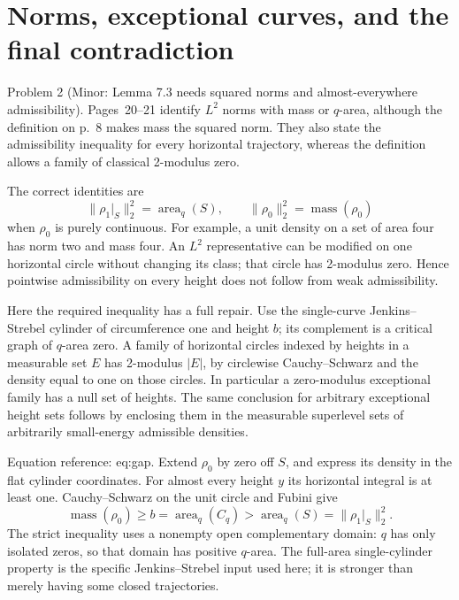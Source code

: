 \documentclass[10pt]{article}
\begin{document}
\section*{Norms, exceptional curves, and the final contradiction}
Problem 2 (Minor: Lemma 7.3 needs squared norms and almost-everywhere admissibility).  Pages 20–21 identify \(L^2\) norms with mass or \(q\)-area, although the definition on p. 8 makes mass the squared norm. They also state the admissibility inequality for every horizontal trajectory, whereas the definition allows a family of classical 2-modulus zero.\par
The correct identities are \[\|\rho_1|_S\|_2^2=\operatorname{area}_q(S),\qquad
 \|\rho_0\|_2^2=\operatorname{mass}(\rho_0)\] when \(\rho_0\) is purely continuous. For example, a unit density on a set of area four has norm two and mass four. An \(L^2\) representative can be modified on one horizontal circle without changing its class; that circle has 2-modulus zero. Hence pointwise admissibility on every height does not follow from weak admissibility.\par
Here the required inequality has a full repair. Use the single-curve Jenkins–Strebel cylinder of circumference one and height \(b\); its complement is a critical graph of \(q\)-area zero. A family of horizontal circles indexed by heights in a measurable set \(E\) has 2-modulus \(|E|\), by circlewise Cauchy–Schwarz and the density equal to one on those circles. In particular a zero-modulus exceptional family has a null set of heights. The same conclusion for arbitrary exceptional height sets follows by enclosing them in the measurable superlevel sets of arbitrarily small-energy admissible densities.\par
Equation reference: eq:gap. Extend \(\rho_0\) by zero off \(S\), and express its density in the flat cylinder coordinates. For almost every height \(y\) its horizontal integral is at least one. Cauchy–Schwarz on the unit circle and Fubini give \[\operatorname{mass}(\rho_0)\ge b=\operatorname{area}_q(C_q)>\operatorname{area}_q(S)
   =\|\rho_1|_S\|_2^2 .
 \] The strict inequality uses a nonempty open complementary domain: \(q\) has only isolated zeros, so that domain has positive \(q\)-area. The full-area single-cylinder property is the specific Jenkins–Strebel input used here; it is stronger than merely having some closed trajectories.\par
\end{document}
